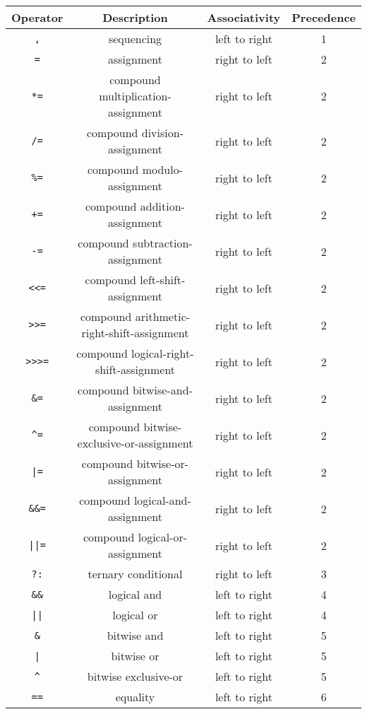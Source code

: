 \documentclass[letterpaper,12pt]{book}
\begin{document}
\begin{longtable}{|c|c|c|c|}
\hline
\textbf{Operator} & \textbf{Description} & \textbf{Associativity} & \textbf{Precedence}\\
\hline
\texttt{,} & sequencing & left to right & 1\\
\hline
\texttt{=} & assignment & right to left & 2\\
\hline
\texttt{*=} & compound multiplication-assignment & right to left & 2\\
\hline
\texttt{/=} & compound division-assignment & right to left & 2\\
\hline
\texttt{\%=} & compound modulo-assignment & right to left & 2\\
\hline
\texttt{+=} & compound addition-assignment & right to left & 2\\
\hline
\texttt{-=} & compound subtraction-assignment & right to left & 2\\
\hline
\texttt{<<=} & compound left-shift-assignment & right to left & 2\\
\hline
\texttt{>>=} & compound arithmetic-right-shift-assignment & right to left & 2\\
\hline
\texttt{>>>=} & compound logical-right-shift-assignment & right to left & 2\\
\hline
\texttt{\&=} & compound bitwise-and-assignment & right to left & 2\\
\hline
\texttt{\^{}=} & compound bitwise-exclusive-or-assignment & right to left & 2\\
\hline
\texttt{|=} & compound bitwise-or-assignment & right to left & 2\\
\hline
\texttt{\&\&=} & compound logical-and-assignment & right to left & 2\\
\hline
\texttt{||=} & compound logical-or-assignment & right to left & 2\\
\hline
\texttt{?:} & ternary conditional & right to left & 3\\
\hline
\texttt{\&\&} & logical and & left to right & 4\\
\hline
\texttt{||} & logical or & left to right & 4\\
\hline
\texttt{\&} & bitwise and & left to right & 5\\
\hline
\texttt{|} & bitwise or & left to right & 5\\
\hline
\texttt{\^{}} & bitwise exclusive-or & left to right & 5\\
\hline
\texttt{==} & equality & left to right & 6\\
\hline

\end{longtable}
\end{document}
